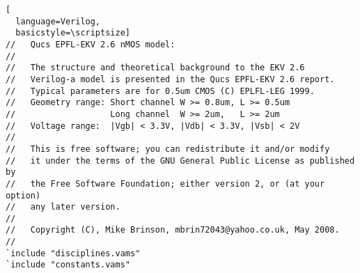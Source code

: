 \begin{lstlisting}[
  language=Verilog,
  basicstyle=\scriptsize]
//   Qucs EPFL-EKV 2.6 nMOS model:
//
//   The structure and theoretical background to the EKV 2.6
//   Verilog-a model is presented in the Qucs EPFL-EKV 2.6 report.
//   Typical parameters are for 0.5um CMOS (C) EPLFL-LEG 1999.
//   Geometry range: Short channel W >= 0.8um, L >= 0.5um
//                   Long channel  W >= 2um,   L >= 2um
//   Voltage range:  |Vgb| < 3.3V, |Vdb| < 3.3V, |Vsb| < 2V
//
//   This is free software; you can redistribute it and/or modify
//   it under the terms of the GNU General Public License as published by
//   the Free Software Foundation; either version 2, or (at your option)
//   any later version.
// 
//   Copyright (C), Mike Brinson, mbrin72043@yahoo.co.uk, May 2008.
//
`include "disciplines.vams"
`include "constants.vams"


\end{lstlisting}
